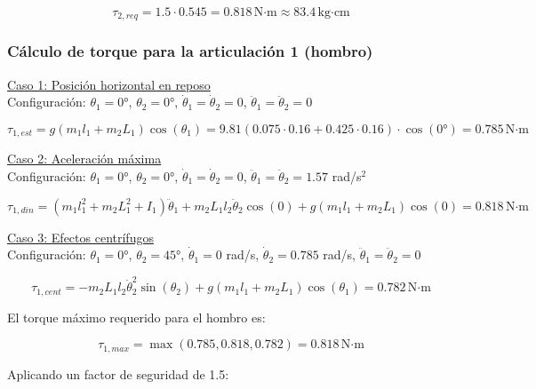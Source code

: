 \begin{equation}
\tau_{2,req} = 1.5 \cdot 0.545 = 0.818 \, \text{N·m} \approx 83.4 \, \text{kg·cm}
\end{equation}

\subsubsection{Cálculo de torque para la articulación 1 (hombro)}

\underline{Caso 1: Posición horizontal en reposo}\\

Configuración: $\theta_1 = 0°$, $\theta_2 = 0°$, $\dot{\theta}_1 = \dot{\theta}_2 = 0$, $\ddot{\theta}_1 = \ddot{\theta}_2 = 0$

\begin{equation}
\tau_{1,est} = g(m_1l_1 + m_2L_1)\cos(\theta_1)
= 9.81(0.075 \cdot 0.16 + 0.425 \cdot 0.16) \cdot \cos(0°)
= 0.785 \, \text{N·m}
\end{equation}

\underline{Caso 2: Aceleración máxima}\\

Configuración: $\theta_1 = 0°$, $\theta_2 = 0°$, $\dot{\theta}_1 = \dot{\theta}_2 = 0$, $\ddot{\theta}_1 = \ddot{\theta}_2 = 1.57$ rad/s$^2$

\begin{equation}
\tau_{1,din} = (m_1l_1^2 + m_2L_1^2 + I_1)\ddot{\theta}_1 + m_2L_1l_2\ddot{\theta}_2\cos(0) + g(m_1l_1 + m_2L_1)\cos(0) = 0.818 \, \text{N·m}
\end{equation}

\underline{Caso 3: Efectos centrífugos}\\

Configuración: $\theta_1 = 0°$, $\theta_2 = 45°$, $\dot{\theta}_1 = 0$ rad/s, $\dot{\theta}_2 = 0.785$ rad/s, $\ddot{\theta}_1 = \ddot{\theta}_2 = 0$

\begin{equation}
\tau_{1,cent} = - m_2L_1l_2\dot{\theta}_2^2\sin(\theta_2) + g(m_1l_1 + m_2L_1)\cos(\theta_1) = 0.782 \, \text{N·m}
\end{equation}

El torque máximo requerido para el hombro es:

\begin{equation}
\tau_{1,max} = \max(0.785, 0.818, 0.782) = 0.818 \, \text{N·m} 
\end{equation}

Aplicando un factor de seguridad de 1.5:

